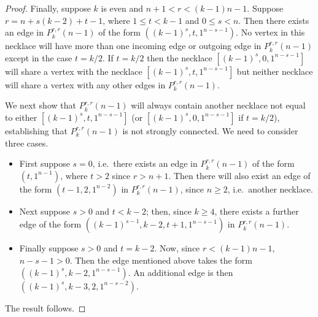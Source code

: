 \documentclass[10pt,a4paper]{amsart}
\begin{document}
\begin{proof}
Finally, suppose $k$ is even and $n+1< r< (k-1)n-1$.  Suppose $r=n+s(k-2)+t-1$, where $1\leq t<k-1$
and $0\leq s<n$.  Then there exists an edge in $P_k^{r,r}(n-1)$ of the form
$((k-1)^s,t,1^{n-s-1})$. No vertex in this necklace will have more than one incoming edge or
outgoing edge in $P_k^{r,r}(n-1)$ except in the case $t=k/2$.  If $t=k/2$ then the necklace
$[(k-1)^s,0,1^{n-s-1}]$ will share a vertex with the necklace $[(k-1)^s,t,1^{n-s-1}]$ but neither
necklace will share a vertex with any other edges in $P_k^{r,r}(n-1)$.

We next show that $P_k^{r,r}(n-1)$ will always contain another necklace not equal to either
$[(k-1)^s,t,1^{n-s-1}]$ (or $[(k-1)^s,0,1^{n-s-1}]$ if $t=k/2$), establishing that $P_k^{r,r}(n-1)$
is not strongly connected. We need to consider three cases.
\begin{itemize}
\item First suppose $s=0$, i.e.\ there exists an edge in $P_k^{r,r}(n-1)$ of the form
    $(t,1^{n-1})$, where $t>2$ since $r>n+1$.  Then there will also exist an edge of the form
    $(t-1,2,1^{n-2})$ in $P_k^{r,r}(n-1)$, since $n\geq2$, i.e.\ another necklace.
\item Next suppose $s>0$ and $t<k-2$; then, since $k\geq4$, there exists a further edge of the
    form $((k-1)^{s-1},k-2,t+1,1^{n-s-1})$ in $P_k^{r,r}(n-1)$.
\item Finally suppose $s>0$ and $t=k-2$.  Now, since $r< (k-1)n-1$, $n-s-1>0$.  Then the edge
    mentioned above takes the form $((k-1)^s,k-2,1^{n-s-1})$.  An additional edge is then
    $((k-1)^s,k-3,2,1^{n-s-2})$.
\end{itemize}
The result follows.
\end{proof}
\end{document}
